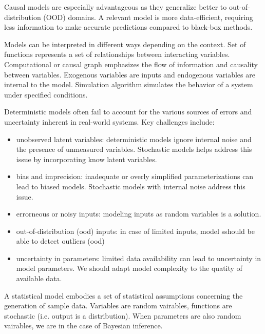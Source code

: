 \documentclass[12pt, a4paper]{article}
\theoremstyle{definition}
\numberwithin{figure}{section}
\numberwithin{equation}{section}
\numberwithin{table}{section}
\begin{document}
Causal models are especially advantageous as they generalize better to out-of-distribution (OOD) domains. A relevant model is more data-efficient, requiring less information to make accurate predictions compared to black-box methods.
\\


Models can be interpreted in different ways depending on the context. Set of functions represents a set of relationships between interacting variables. Computational or causal graph emphasizes the flow of information and causality between variables. Exogenous variables are inputs and endogenous variables are internal to the model. Simulation algorithm simulates the behavior of a system under specified conditions. \\


Deterministic models often fail to account for the various sources of errors and uncertainty inherent in real-world systems. Key challenges include:
\begin{itemize}
    \item unobserved latent variables: deterministic models ignore internal noise and the presence of unmeasured variables. Stochastic models helps address this issue by incorporating know latent variables.
    \item bias and imprecision: inadequate or overly simplified parameterizations can lead to biased models. Stochastic models with internal noise address this issue.
    \item errorneous or noisy inputs: modeling inputs as random variables is a solution.
    \item out-of-distribution (ood) inputs: in case of limited inputs, model sshould be able to detect outliers (ood)
    \item uncertainty in parameters: limited data availability can lead to uncertainty in model parameters. We should adapt model complexity to the quatity of available data. \\
\end{itemize}


A statistical model embodies a set of statistical assumptions concerning the generation of sample data. Variables are random vairables, functions are stochastic (i.e. output is a distribution). When parameters are also random vairables, we are in the case of Bayesian inference.
\end{document}
